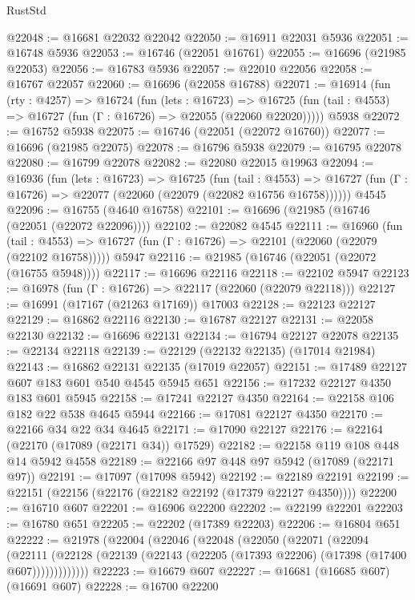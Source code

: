 \begin{lexlean}{RustStd}
\begin{coremodule}
@22048 := @16681 @22032 @22042
@22050 := @16911 @22031 @5936
@22051 := @16748 @5936
@22053 := @16746 (@22051 @16761)
@22055 := @16696 (@21985 @22053)
@22056 := @16783 @5936
@22057 := @22010 @22056
@22058 := @16767 @22057
@22060 := @16696 (@22058 @16788)
@22071 := @16914
    (fun (rty : @4257) =>
    @16724
      (fun (lets : @16723) =>
      @16725 (fun (tail : @4553) => @16727 (fun (Γ : @16726) => @22055 (@22060 @22020)))))
    @5938
@22072 := @16752 @5938
@22075 := @16746 (@22051 (@22072 @16760))
@22077 := @16696 (@21985 @22075)
@22078 := @16796 @5938
@22079 := @16795 @22078
@22080 := @16799 @22078
@22082 := @22080 @22015 @19963
@22094 := @16936
    (fun (lets : @16723) =>
    @16725
      (fun (tail : @4553) =>
      @16727 (fun (Γ : @16726) => @22077 (@22060 (@22079 (@22082 @16756 @16758))))))
    @4545
@22096 := @16755 (@4640 @16758)
@22101 := @16696 (@21985 (@16746 (@22051 (@22072 @22096))))
@22102 := @22082 @4545
@22111 := @16960
    (fun (tail : @4553) => @16727 (fun (Γ : @16726) => @22101 (@22060 (@22079 (@22102 @16758)))))
    @5947
@22116 := @21985 (@16746 (@22051 (@22072 (@16755 @5948))))
@22117 := @16696 @22116
@22118 := @22102 @5947
@22123 := @16978 (fun (Γ : @16726) => @22117 (@22060 (@22079 @22118)))
@22127 := @16991 (@17167 (@21263 @17169)) @17003
@22128 := @22123 @22127
@22129 := @16862 @22116
@22130 := @16787 @22127
@22131 := @22058 @22130
@22132 := @16696 @22131
@22134 := @16794 @22127 @22078
@22135 := @22134 @22118
@22139 := @22129 (@22132 @22135) (@17014 @21984)
@22143 := @16862 @22131 @22135 (@17019 @22057)
@22151 := @17489 @22127 @607 @183 @601 @540 @4545 @5945 @651
@22156 := @17232 @22127 @4350 @183 @601 @5945
@22158 := @17241 @22127 @4350
@22164 := @22158 @106 @182 @22 @538 @4645 @5944
@22166 := @17081 @22127 @4350
@22170 := @22166 @34 @22 @34 @4645
@22171 := @17090 @22127
@22176 := @22164 (@22170 (@17089 (@22171 @34)) @17529)
@22182 := @22158 @119 @108 @448 @14 @5942 @4558
@22189 := @22166 @97 @448 @97 @5942 (@17089 (@22171 @97))
@22191 := @17097 (@17098 @5942)
@22192 := @22189 @22191
@22199 := @22151 (@22156 (@22176 (@22182 @22192 (@17379 @22127 @4350))))
@22200 := @16710 @607
@22201 := @16906 @22200
@22202 := @22199 @22201
@22203 := @16780 @651
@22205 := @22202 (@17389 @22203)
@22206 := @16804 @651
@22222 := @21978
    (@22004
      (@22046
        (@22048
          (@22050
            (@22071
              (@22094
                (@22111
                  (@22128 (@22139 (@22143 (@22205 (@17393 @22206) (@17398 (@17400 @607)))))))))))))
@22223 := @16679 @607
@22227 := @16681 (@16685 @607) (@16691 @607)
@22228 := @16700 @22200

\end{coremodule}
\end{lexlean}
